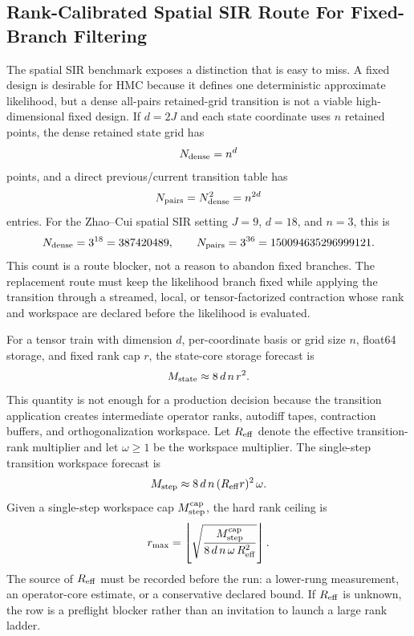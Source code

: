 \documentclass[11pt]{article}
\numberwithin{equation}{section}
\begin{document}
\subsection{Rank-Calibrated Spatial SIR Route For Fixed-Branch Filtering}
\label{sec:p52-rank-calibrated-spatial-sir-route}

The spatial SIR benchmark exposes a distinction that is easy to miss.  A fixed
design is desirable for HMC because it defines one deterministic approximate
likelihood, but a dense all-pairs retained-grid transition is not a viable
high-dimensional fixed design.  If \(d=2J\) and each state coordinate uses
\(n\) retained points, the dense retained state grid has
\begin{equation}
    N_{\rm dense}=n^d
    \label{eq:p52-dense-grid-count}
\end{equation}
points, and a direct previous/current transition table has
\begin{equation}
    N_{\rm pairs}=N_{\rm dense}^2=n^{2d}
    \label{eq:p52-dense-pair-count}
\end{equation}
entries.  For the Zhao--Cui spatial SIR setting \(J=9\), \(d=18\), and
\(n=3\), this is
\begin{equation}
    N_{\rm dense}=3^{18}=387420489,
    \qquad
    N_{\rm pairs}=3^{36}=150094635296999121.
    \label{eq:p52-sir-d18-dense-count}
\end{equation}
This count is a route blocker, not a reason to abandon fixed branches.  The
replacement route must keep the likelihood branch fixed while applying the
transition through a streamed, local, or tensor-factorized contraction whose
rank and workspace are declared before the likelihood is evaluated.

For a tensor train with dimension \(d\), per-coordinate basis or grid size
\(n\), float64 storage, and fixed rank cap \(r\), the state-core storage
forecast is
\begin{equation}
    M_{\rm state}\approx 8\,d\,n\,r^2.
    \label{eq:p52-state-memory}
\end{equation}
This quantity is not enough for a production decision because the transition
application creates intermediate operator ranks, autodiff tapes, contraction
buffers, and orthogonalization workspace.  Let \(R_{\rm eff}\) denote the
effective transition-rank multiplier and let \(\omega\ge1\) be the workspace
multiplier.  The single-step transition workspace forecast is
\begin{equation}
    M_{\rm step}\approx
    8\,d\,n\,(R_{\rm eff}r)^2\,\omega.
    \label{eq:p52-step-memory}
\end{equation}
Given a single-step workspace cap \(M_{\rm step}^{\rm cap}\), the hard rank
ceiling is
\begin{equation}
    r_{\max}
    =
    \left\lfloor
    \sqrt{
    \frac{M_{\rm step}^{\rm cap}}
         {8\,d\,n\,\omega\,R_{\rm eff}^2}}
    \right\rfloor.
    \label{eq:p52-rank-ceiling}
\end{equation}
The source of \(R_{\rm eff}\) must be recorded before the run: a lower-rung
measurement, an operator-core estimate, or a conservative declared bound.  If
\(R_{\rm eff}\) is unknown, the row is a preflight blocker rather than an
invitation to launch a large rank ladder.
\end{document}
